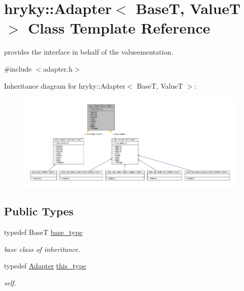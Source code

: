 \hypertarget{classhryky_1_1_adapter}{\section{hryky\-:\-:Adapter$<$ Base\-T, Value\-T $>$ Class Template Reference}
\label{classhryky_1_1_adapter}
}


provides the interface in behalf of the valueementation.  




{\ttfamily \#include $<$adapter.\-h$>$}



Inheritance diagram for hryky\-:\-:Adapter$<$ Base\-T, Value\-T $>$\-:
\nopagebreak
\begin{figure}[H]
\begin{center}
\leavevmode
\includegraphics[width=350pt]{classhryky_1_1_adapter__inherit__graph}
\end{center}
\end{figure}
\subsection*{Public Types}
\begin{DoxyCompactItemize}
\item 
\hypertarget{classhryky_1_1_adapter_a577d587d418b924d5d57f80b21d3e3cb}{typedef Base\-T \hyperlink{classhryky_1_1_adapter_a577d587d418b924d5d57f80b21d3e3cb}{base\-\_\-type}}\label{classhryky_1_1_adapter_a577d587d418b924d5d57f80b21d3e3cb}

\begin{DoxyCompactList}\small\item\em base class of inheritance. \end{DoxyCompactList}\item 
\hypertarget{classhryky_1_1_adapter_a30de4db4c91a113187fa2f0edbcb1b2a}{typedef \hyperlink{classhryky_1_1_adapter}{Adapter} \hyperlink{classhryky_1_1_adapter_a30de4db4c91a113187fa2f0edbcb1b2a}{this\-\_\-type}}\label{classhryky_1_1_adapter_a30de4db4c91a113187fa2f0edbcb1b2a}

\begin{DoxyCompactList}\small\item\em self. \end{DoxyCompactList}\end{DoxyCompactItemize}
